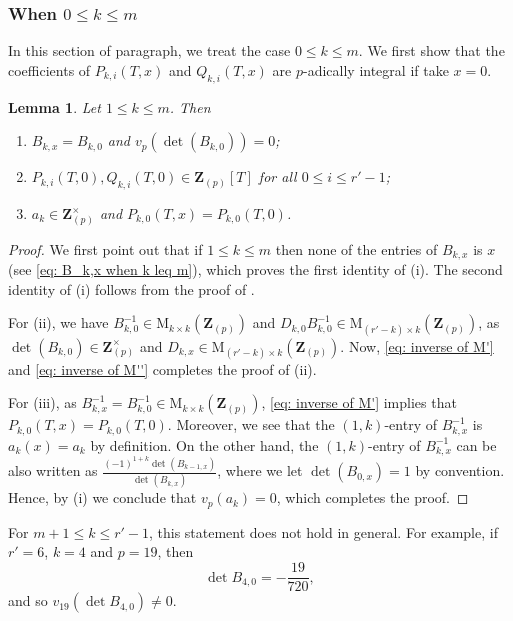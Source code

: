 \documentclass[11pt]{amsart}
\theoremstyle{definition}
\numberwithin{equation}{subsection}
\theoremstyle{plain}
\theoremstyle{plain}
\theoremstyle{plain}
\theoremstyle{plain}
\theoremstyle{plain}
\theoremstyle{plain}
\theoremstyle{plain}
\theoremstyle{plain}
\theoremstyle{plain}
\newtheorem{lemm}[equation]{Lemma}
\theoremstyle{plain}
\theoremstyle{plain}
\theoremstyle{plain}
\theoremstyle{definition}
\theoremstyle{definition}
\theoremstyle{definition}
\theoremstyle{remark}
\renewcommand{\(}{\textup{(}}
\renewcommand{\)}{\textup{)}}
\newcommand{\M}{\mathrm{M}}
\newcommand{\Z}{\mathbf{Z}}
\begin{document}
\subsubsection{\textbf{When $0\leq k\leq m$}}
In this section of paragraph, we treat the case $0\leq k\leq m$. We first show that the coefficients of $P_{k,i}(T,x)$ and $Q_{k,i}(T,x)$ are $p$-adically integral if take $x=0$.
\begin{lemm}\label{lemma: B_k,0 k leq m}
Let $1\leq k\leq m$. Then
\begin{enumerate}[leftmargin=*]
    \item $B_{k,x}=B_{k,0}$ and $v_p(\det(B_{k,0}))=0$;
    \item $P_{k,i}(T,0),Q_{k,i}(T,0)\in \Z_{(p)}[T]$ for all $0\leq i\leq r'-1$;
    \item $a_k\in\Z_{(p)}^{\times}$ and $P_{k,0}(T,x)=P_{k,0}(T,0)$.
\end{enumerate}
\end{lemm}

\begin{proof}
We first point out that if $1\leq k\leq m$ then none of the entries of $B_{k,x}$ is $x$ (see \eqref{eq: B_k,x when k leq m}), which proves the first identity of (i). The second identity of (i) follows from the proof of \cite[Lemma~4.1.1]{GP}.

For (ii), we have $B_{k,0}^{-1}\in \M_{k\times k}(\Z_{(p)})$ and $D_{k,0}B_{k,0}^{-1}\in\M_{(r'-k)\times k}(\Z_{(p)})$, as $\det(B_{k,0})\in\Z_{(p)}^\times$ and $D_{k,x}\in \M_{(r'-k)\times k}(\Z_{(p)})$. Now, \eqref{eq: inverse of M'} and \eqref{eq: inverse of M''} completes the proof of (ii).

For (iii), as $B_{k,x}^{-1}=B_{k,0}^{-1}\in \M_{k\times k}(\Z_{(p)})$, \eqref{eq: inverse of M'} implies that $P_{k,0}(T,x)=P_{k,0}(T,0)$. Moreover, we see that the $(1,k)$-entry of $B_{k,x}^{-1}$ is $a_k(x)=a_k$ by definition. On the other hand, the $(1,k)$-entry of $B_{k,x}^{-1}$ can be also written as $\frac{(-1)^{1+k}\det(B_{k-1,x})}{\det(B_{k,x})}$, where we let $\det(B_{0,x})=1$ by convention. Hence, by (i) we conclude that $v_p(a_k)=0$, which completes the proof.
\end{proof}


For $m+1\leq k\leq r'-1$, this statement does not hold in general. For example, if $r'=6$, $k=4$ and $p=19$, then
    \begin{equation*}
        \det B_{4,0}=-\frac{19}{720},
    \end{equation*}
and so $v_{19}(\det B_{4,0})\neq 0$.
\end{document}
